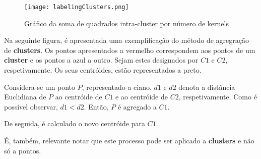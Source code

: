 \begin{figure}[h]
 
	\centering
 	\texttt{[image: labelingClusters.png]} 
	\caption{Gráfico da soma de quadrados intra-cluster por número de kernels}
\end{figure}

\par Na seguinte figura, é apresentada uma exemplificação do método de agregração de \textbf{clusters}.
Os pontos apresentados a vermelho correspondem aos pontos de um \textbf{cluster} e os pontos a azul a outro.
Sejam estes designados por $C1$ e $C2$, respetivamente. Os seus centróides, estão representados a preto.

\par Considera-se um ponto $P$, representado a ciano. $d1$ e $d2$ denota a distância Euclidiana de $P$ ao centróide de
$C1$ e ao centróide de $C2$, respetivamente.
Como é possível observar, $d1 < d2$. Então, $P$ é agregado a $C1$.

\par De seguida, é calculado o novo centróide para $C1$.

\par É, também, relevante notar que este processo pode ser aplicado a \textbf{clusters} e não só a pontos.




